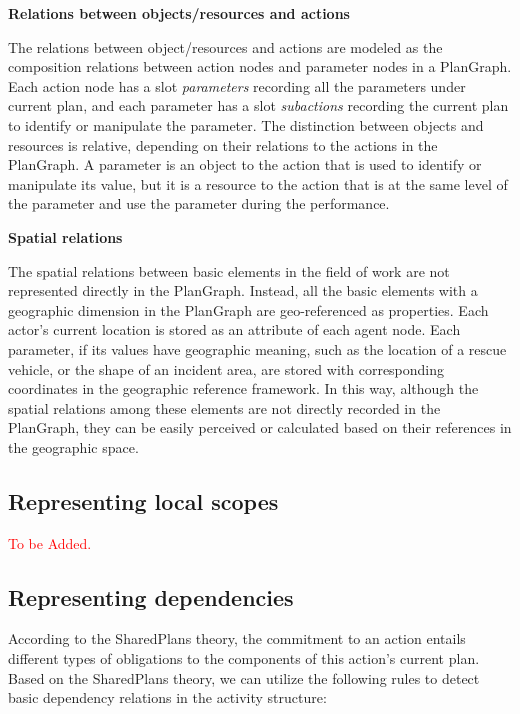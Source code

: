 \textbf{Relations between objects/resources and actions}

The relations between object/resources and actions are modeled as the composition relations between action nodes and parameter nodes in a PlanGraph. Each action node has a slot \emph{parameters} recording all the parameters under current plan, and each parameter has a slot \emph{subactions} recording the current plan to identify or manipulate the parameter. The distinction between objects and resources is relative, depending on their relations to the actions in the PlanGraph. A parameter is an object to the action that is used to identify or manipulate its value, but it is a resource to the action that is at the same level of the parameter and use the parameter during the performance. 

\textbf{Spatial relations}

The spatial relations between basic elements in the field of work are not represented directly in the PlanGraph. Instead, all the basic elements with a geographic dimension in the PlanGraph are geo-referenced as properties. Each actor's current location is stored as an attribute of each agent node. Each parameter, if its values have geographic meaning, such as the location of a rescue vehicle, or the shape of an incident area, are stored with corresponding coordinates in the geographic reference framework. In this way, although the spatial relations among these elements are not directly recorded in the PlanGraph, they can be easily perceived or calculated based on their references in the geographic space. 


\subsection{Representing local scopes} %
\label{sub:representing_local_scopes}
\textcolor{red}{To be Added.}


\subsection{Representing dependencies} %
\label{sub:representing_dependencies}

According to the SharedPlans theory, the commitment to an action entails different types of obligations to the components of this action's current plan. Based on the SharedPlans theory, we can utilize the following rules to detect basic dependency relations in the activity structure:

